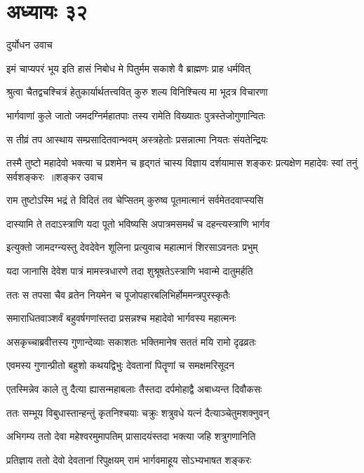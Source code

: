 \chapter{अध्यायः ३२}
\twolineshloka
{दुर्योधन उवाच}
{}


\twolineshloka
{इमं चाप्यपरं भूय इति हासं निबोध मे}
{पितुर्मम सकाशे वै ब्राह्मणः प्राह धर्मवित्}


\twolineshloka
{श्रुत्वा चैतद्वचश्चित्रं हेतुकार्यार्थतत्त्ववित्}
{कुरु शल्य विनिश्चित्य मा भूदत्र विचारणा}


\twolineshloka
{भार्गवाणां कुले जातो जमदग्निर्महातपाः}
{तस्य रामेति विख्यातः पुत्रस्तेजोगुणान्वितः}


\twolineshloka
{स तीव्रं तप आस्थाय सम्प्रसादितवान्भवम्}
{अस्त्रहेतोः प्रसन्नात्मा नियतः संयतेन्द्रियः}


\fourlineindentedshloka
{तस्मै तुष्टो महादेवो भक्त्या च प्रशमेन च}
{हृद्गतं चास्य विज्ञाय दर्शयामास शङ्करः}
{प्रत्यक्षेण महादेवः स्वां तनुं सर्वशङ्करः ॥शङ्कर उवाच}
{}


\twolineshloka
{राम तुष्टोऽस्मि भद्रं ते विदितं तव चेप्सितम्}
{कुरुष्व पूतमात्मानं सर्वमेतदवाप्स्यसि}


\twolineshloka
{दास्यामि ते तदाऽस्त्राणि यदा पूतो भविष्यसि}
{अपात्रमसमर्थं च दहन्त्यस्त्राणि भार्गव}


\twolineshloka
{इत्युक्तो जामदग्न्यस्तु देवदेवेन शूलिना}
{प्रत्युवाच महात्मानं शिरसाऽवनतः प्रभुम्}


\twolineshloka
{यदा जानासि देवेश पात्रं मामस्त्रधारणे}
{तदा शुश्रूषतेऽस्त्राणि भवान्मे दातुमर्हति}


\twolineshloka
{ततः स तपसा चैव व्रतेन नियमेन च}
{पूजोपहारबलिभिर्होममन्त्रपुरस्कृतैः}


\twolineshloka
{समाराधितवाञ्शर्वं बहुवर्षगणांस्तदा}
{प्रसन्नश्च महादेवो भार्गवस्य महात्मनः}


\twolineshloka
{असकृच्चाब्रवीत्तस्य गुणान्देव्याः सकाशतः}
{भक्तिमानेष सततं मयि रामो दृढव्रतः}


\twolineshloka
{एवमस्य गुणान्प्रीतो बहुशो कथयद्विभुः}
{देवतानां पितॄणां च समक्षमरिसूदन}


\twolineshloka
{एतस्मिन्नेव काले तु दैत्या ह्यासन्महाबलाः}
{तैस्तदा दर्पमोहाद्वै अबाध्यन्त दिवौकसः}


\twolineshloka
{ततः सम्भूय विबुधास्तान्हन्तुं कृतनिश्चयाः}
{चक्रुः शत्रुवधे यत्नं दैत्याञ्चेतुमशक्नुवन्}


\twolineshloka
{अभिगम्य ततो देवा महेश्वरमुमापतिम्}
{प्रासादयंस्तदा भक्त्या जहि शत्रुगणानिति}


\twolineshloka
{प्रतिज्ञाय ततो देवो देवतानां रिपुक्षयम्}
{रामं भार्गवमाहूय सोऽभ्यभाषत शङ्करः}


